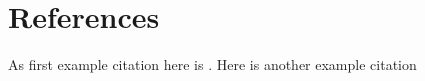 \documentclass[
11pt, %
english, %
singlespacing, %
headsepline, %
]{MastersDoctoralThesis} %
\begin{document}
\appendix %


%
%
%
\section*{References}
As first example citation here is \cite{cover_trees}. 
Here is another example citation \cite{sift_lowe}


{}


\end{document}
